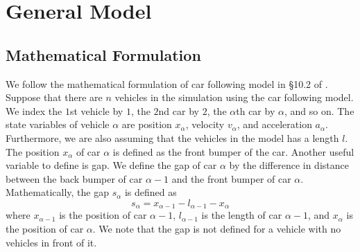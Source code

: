 \documentclass[12pt]{article}
\begin{document}
    \section{General Model}
    \subsection{Mathematical Formulation}\label{ch1}
        We follow the mathematical formulation of car following model in \S 10.2 of \cite{traffic}. Suppose that there are $n$ vehicles in the simulation using the car following model. We index the $1$st vehicle by $1$, the $2$nd car by $2$, the $\alpha$th car by $\alpha$, and so on. The state variables of vehicle $\alpha$ are position $x_\alpha$, velocity $v_\alpha$, and acceleration $a_\alpha$. Furthermore, we are also assuming that the vehicles in the model has a length $l$. The position $x_\alpha$ of car $\alpha$ is defined as the front bumper of the car. Another useful variable to define is gap. We define the gap of car $\alpha$ by the difference in distance between the back bumper of car $\alpha - 1$ and the front bumper of car $\alpha$. Mathematically, the gap $s_\alpha$ is defined as 
        \begin{equation} 
          s_\alpha = x_{\alpha - 1} - l_{\alpha -1}  - x_{\alpha}
        \end{equation}
        where $x_{\alpha - 1}$ is the position of car $\alpha - 1$, $l_{\alpha - 1}$ is the length of car $\alpha - 1$, and $x_\alpha$ is the position of car $\alpha$. We note that the gap is not defined for a vehicle with no vehicles in front of it. 
\end{document}
